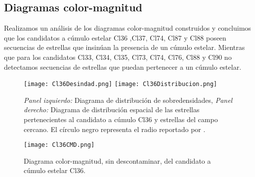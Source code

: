 \documentclass[baaa]{baaa}
\begin{document}
\subsection{Diagramas color-magnitud}
Realizamos un análisis de los diagramas color-magnitud construidos y concluimos que los candidatos a cúmulo estelar  Cl36 ,Cl37, Cl74, Cl87 y Cl88 poseen secuencias de estrellas que insinúan la presencia de un cúmulo estelar. Mientras que para los candidatos Cl33, Cl34, Cl35, Cl73, Cl74, Cl76, Cl88 y Cl90  no detectamos secuencias de estrellas que puedan pertenecer a un cúmulo estelar. 
\par


\begin{figure*} 
 \centering
  {

    \texttt{[image: Cl36Desindad.png]}
    \texttt{[image: Cl36Distribucion.png]}}
 \caption{\emph{Panel izquierdo:} Diagrama de distribución de sobredensidades, \emph{Panel derecho:} Diagrama de distribución espacial de las estrellas pertenecientes al candidato a cúmulo Cl36 y estrellas del campo cercano. El círculo negro representa el radio reportado por \cite{borissova2011new}.}
\end{figure*}


\begin{figure}
\centering
\texttt{[image: Cl36CMD.png]}
\caption{Diagrama color-magnitud, sin descontaminar, del candidato a cúmulo estelar Cl36.}
\label{Figura}
\end{figure}
\end{document}
